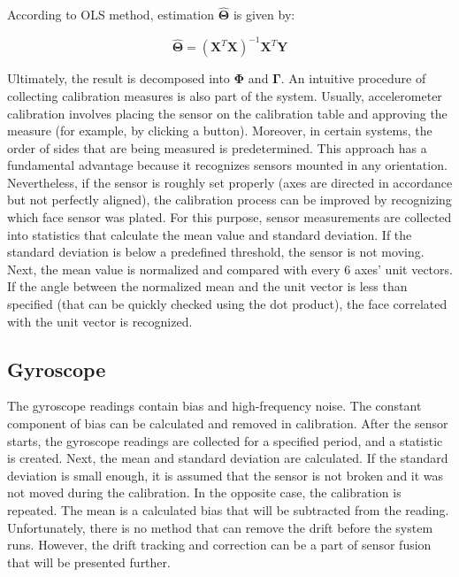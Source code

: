 According to OLS method, estimation $\bm{\hat{\Theta}}$ is given by:

\begin{equation}
	\bm{\hat{\Theta}} = \left( \bm{X}^T \bm{X} \right)^{-1} \bm{X}^T \bm{Y}
	\label{ols_est}
\end{equation}

Ultimately, the result is decomposed into $\bm{\Phi}$ and $\bm{\Gamma}$. An intuitive procedure of collecting calibration measures is also part of the system. Usually, accelerometer calibration involves placing the sensor on the calibration table and approving the measure (for example, by clicking a button). Moreover, in certain systems, the order of sides that are being measured is predetermined. This approach has a fundamental advantage because it recognizes sensors mounted in any orientation. Nevertheless, if the sensor is roughly set properly (axes are directed in accordance but not perfectly aligned), the calibration process can be improved by recognizing which face sensor was plated. For this purpose, sensor measurements are collected into statistics that calculate the mean value and standard deviation. If the standard deviation is below a predefined threshold, the sensor is not moving. Next, the mean value is normalized and compared with every 6 axes’ unit vectors. If the angle between the normalized mean and the unit vector is less than specified (that can be quickly checked using the dot product), the face correlated with the unit vector is recognized.



\subsection{Gyroscope}

The gyroscope readings contain bias and high-frequency noise. The constant component of bias can be calculated and removed in calibration. After the sensor starts, the gyroscope readings are collected for a specified period, and a statistic is created. Next, the mean and standard deviation are calculated. If the standard deviation is small enough, it is assumed that the sensor is not broken and it was not moved during the calibration. In the opposite case, the calibration is repeated. The mean is a calculated bias that will be subtracted from the reading. Unfortunately, there is no method that can remove the drift before the system runs. However, the drift tracking and correction can be a part of sensor fusion that will be presented further.


